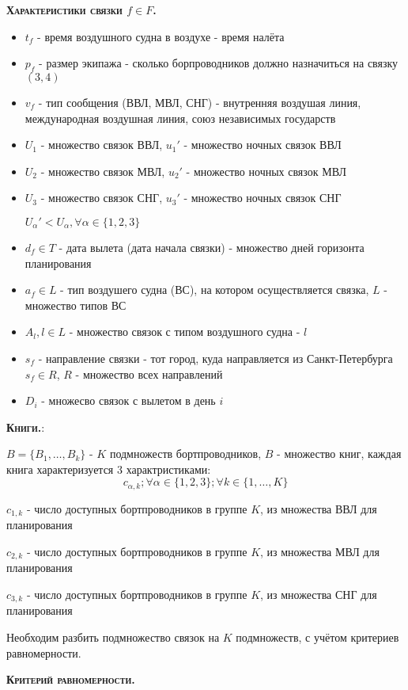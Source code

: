 \documentclass[%
10pt, %
final, %
oneside, %
onecolumn, %
centertags]{article} %
\theoremstyle{plain}
\theoremstyle{definition}
\theoremstyle{remark}
\begin{document}
\textbf{\textsc{Характеристики связки $f \in F$.}}
\begin{itemize}
	\item $t_f$ - время воздушного судна в воздухе - время налёта
	\item $p_f$ - размер экипажа - сколько борпроводников должно назначиться на связку $(3,4)$
	\item $v_f$ - тип сообщения (ВВЛ, МВЛ, СНГ) - внутренняя воздушая линия, международная воздушная линия, союз независимых государств
	\item $U_1$ - множество связок ВВЛ, $u_1'$ - множество ночных связок ВВЛ
	\item $U_2$ - множество связок МВЛ, $u_2'$ - множество ночных связок МВЛ
	\item $U_3$ - множество связок СНГ, $u_3'$ - множество ночных связок СНГ
	
	$U_{\alpha}' < U_{\alpha}, \forall \alpha \in \{1,2,3\}$
	\item $d_f \in T$ - дата вылета (дата начала связки) - множество дней горизонта планирования
	\item $a_f \in L$ - тип воздушего судна (ВС), на котором осуществляется связка, $L$ - множество типов ВС

	\item $A_l, l \in L$ - множество связок с типом воздушного судна -  $l$
	\item $s_f$ - направление связки - тот город, куда направляется из Санкт-Петербурга $s_f \in R$, $R$ - множество всех направлений
	\item $D_i$ - множесво связок с вылетом в день $i$
\end{itemize}

\textbf{\textsc{Книги.}}:

$B = \{B_1,\ldots,B_k\}$ - $K$ подмножеств бортпроводников, $B$ - множество книг, каждая книга характеризуется $3$ характристиками:
$$c_{\alpha,k}; \forall \alpha \in \{1,2,3\}; \forall k \in \{1,\ldots,K\}$$

$c_{1,k}$ - число доступных бортпроводников в группе $K$, из множества ВВЛ для планирования

$c_{2,k}$ - число доступных бортпроводников в группе $K$, из множества МВЛ для планирования

$c_{3,k}$ - число доступных бортпроводников в группе $K$, из множества СНГ для планирования

Необходим разбить подмножество связок на $K$ подмножеств, с учётом критериев равномерности.

\textbf{\textsc{Критерий равномерности.}}
\end{document}
